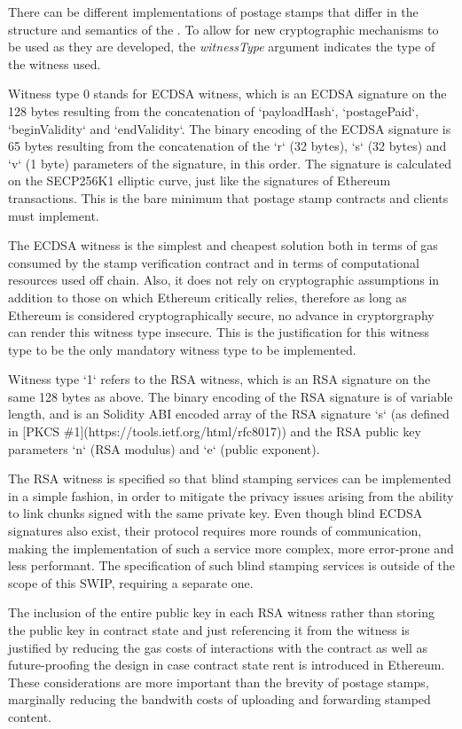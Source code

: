 
There can be different implementations of postage stamps that differ in the structure and semantics of the . To allow for new cryptographic mechanisms to be used as they are developed, the \emph{witnessType} argument indicates the type of the witness used. 

Witness type 0 stands for ECDSA witness, which is an ECDSA signature on the 128 bytes resulting from the concatenation of `payloadHash`, `postagePaid`, `beginValidity` and `endValidity`. The binary encoding of the ECDSA signature is 65 bytes resulting from the concatenation of the `r` (32 bytes), `s` (32 bytes) and `v` (1 byte) parameters of the signature, in this order. The signature is calculated on the SECP256K1 elliptic curve, just like the signatures of Ethereum transactions. This is the bare minimum that postage stamp contracts and clients must implement.

The ECDSA witness is the simplest and cheapest solution both in terms of gas consumed by the stamp verification contract and in terms of computational resources used off chain. Also, it does not rely on cryptographic assumptions in addition to those on which Ethereum critically relies, therefore as long as Ethereum is considered cryptographically secure, no advance in cryptorgraphy can render this witness type insecure. This is the justification for this witness type to be the only mandatory witness type to be implemented.

Witness type `1` refers to the RSA witness, which is an RSA signature on the same 128 bytes as above. The binary encoding of the RSA signature is of variable length, and is an Solidity ABI encoded array of the RSA signature `s` (as defined in [PKCS \#1](https://tools.ietf.org/html/rfc8017)) and the RSA public key parameters `n` (RSA modulus) and `e` (public exponent).

The RSA witness is specified so that blind stamping services can be implemented in a simple fashion, in order to mitigate the privacy issues arising from the ability to link chunks signed with the same private key. Even though blind ECDSA signatures also exist, their protocol requires more rounds of communication, making the implementation of such a service more complex, more error-prone and less performant. The specification of such blind stamping services is outside of the scope of this SWIP, requiring a separate one.

The inclusion of the entire public key in each RSA witness rather than storing the public key in contract state and just referencing it from the witness is justified by reducing the gas costs of interactions with the contract as well as future-proofing the design in case contract state rent is introduced in Ethereum. These considerations are more important than the brevity of postage stamps, marginally reducing the bandwith costs of uploading and forwarding stamped content.

